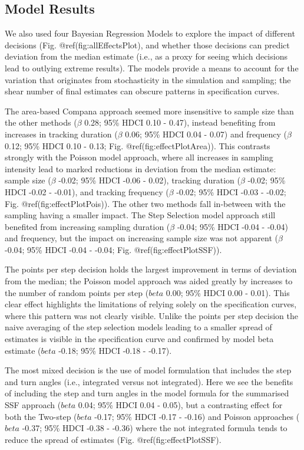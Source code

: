 \documentclass[10pt,a4paper]{article}
\begin{document}
\subsection{Model Results}\label{model-results}

We also used four Bayesian Regression Models to explore the impact of different decisions (Fig. @ref(fig:allEffectsPlot), and whether those decisions can predict deviation from the median estimate (i.e., as a proxy for seeing which decisions lead to outlying extreme results).
The models provide a means to account for the variation that originates from stochasticity in the simulation and sampling; the shear number of final estimates can obscure patterns in specification curves.

The area-based Compana approach seemed more insensitive to sample size than the other methods (\(\beta\) 0.28; 95\% HDCI 0.10 - 0.47), instead benefiting from increases in tracking duration (\(\beta\) 0.06; 95\% HDCI 0.04 - 0.07) and frequency (\(\beta\) 0.12; 95\% HDCI 0.10 - 0.13; Fig. @ref(fig:effectPlotArea)).
This contrasts strongly with the Poisson model approach, where all increases in sampling intensity lead to marked reductions in deviation from the median estimate: sample size (\(\beta\) -0.02; 95\% HDCI -0.06 - 0.02), tracking duration (\(\beta\) -0.02; 95\% HDCI -0.02 - -0.01), and tracking frequency (\(\beta\) -0.02; 95\% HDCI -0.03 - -0.02; Fig. @ref(fig:effectPlotPois)).
The other two methods fall in-between with the sampling having a smaller impact.
The Step Selection model approach still benefited from increasing sampling duration (\(\beta\) -0.04; 95\% HDCI -0.04 - -0.04) and frequency, but the impact on increasing sample size was not apparent (\(\beta\) -0.04; 95\% HDCI -0.04 - -0.04; Fig. @ref(fig:effectPlotSSF)).

The points per step decision holds the largest improvement in terms of deviation from the median; the Poisson model approach was aided greatly by increases to the number of random points per step (\(beta\) 0.00; 95\% HDCI 0.00 - 0.01).
This clear effect highlights the limitations of relying solely on the specification curves, where this pattern was not clearly visible.
Unlike the points per step decision the naive averaging of the step selection models leading to a smaller spread of estimates is visible in the specification curve and confirmed by model beta estimate (\(beta\) -0.18; 95\% HDCI -0.18 - -0.17).

The most mixed decision is the use of model formulation that includes the step and turn angles (i.e., integrated versus not integrated).
Here we see the benefits of including the step and turn angles in the model formula for the summarised SSF approach (\(beta\) 0.04; 95\% HDCI 0.04 - 0.05), but a contrasting effect for both the Two-step (\(beta\) -0.17; 95\% HDCI -0.17 - -0.16) and Poisson approaches (\(beta\) -0.37; 95\% HDCI -0.38 - -0.36) where the not integrated formula tends to reduce the spread of estimates (Fig. @ref(fig:effectPlotSSF).
\end{document}
